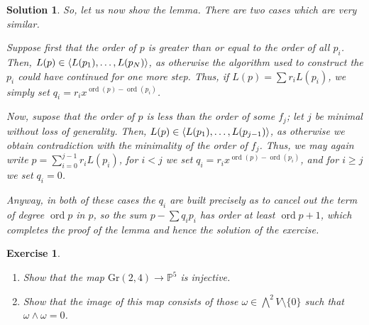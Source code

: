 \documentclass{article}
\newtheorem{ex}{Exercise}
\theoremstyle{nonumberplain}
\newtheorem{sol}{Solution}
\newcommand{\PP}{\mathbb{P}}
\newcommand{\Gr}{\mathrm{Gr}}
\DeclareMathOperator{\ord}{ord}
\DeclarePairedDelimiter{\braket}{\langle}{\rangle}
\begin{document}
\begin{sol}
So, let us now show the lemma. There are two cases which are very similar.

Suppose first that the order of $p$ is greater than or equal to the order of all $p_i$. Then, $L(p) \in \braket{L(p_1), \dots, L(p_N)}$, as otherwise  the algorithm used to construct the $p_i$ could have continued for one more step. Thus, if $L(p) = \sum r_i L(p_i)$, we simply set $q_i = r_i x^{\ord(p) - \ord(p_i)}$.

Now, supose that the order of $p$ is less than the order of some $f_j$; let $j$ be minimal without loss of generality. Then, $L(p) \in \braket{L(p_1), \dots, L(p_{j-1})}$, as otherwise we obtain contradiction with the minimality of the order of $f_j$. Thus, we may again write $p = \sum_{i = 0}^{j-1} r_i L(p_i)$, for $i < j$ we set $q_i = r_i x^{\ord(p) - \ord(p_i)}$, and for $i \geq j$ we set $q_i = 0$.

Anyway, in both of these cases the $q_i$ are built precisely as to cancel out the term of degree $\ord p$ in $p$, so the sum $p - \sum q_i p_i$ has order at least $\ord p + 1$, which completes the proof of the lemma and hence the solution of the exercise.
\end{sol}

\begin{ex}
\begin{enumerate}
\item Show that the map $\Gr(2,4) \to \PP^5$ is injective.
\item Show that the image of this map consists of those $\omega \in \bigwedge^2 V \setminus \{0\}$ such that $\omega \wedge \omega = 0$.
\end{enumerate}
\end{ex}
\end{document}
